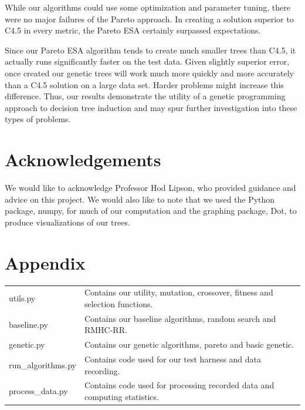 \documentclass{acm_proc_article-sp}
\begin{document}
While our algorithms could use some optimization and parameter tuning, there were no major failures of the Pareto approach. In creating a solution superior to C4.5 in every metric, the Pareto ESA certainly surpassed expectations.

Since our Pareto ESA algorithm tends to create much smaller trees than C4.5, it actually runs significantly faster on the test data. Given slightly superior error, once created our genetic trees will work much more quickly and more accurately than a C4.5 solution on a large data set. Harder problems might increase this difference. Thus, our results demonstrate the utility of a genetic programming approach to decision tree induction and may spur further investigation into these types of problems.

\section{Acknowledgements}

We would like to acknowledge Professor Hod Lipson, who provided guidance and advice on this project. We would also like to note that we used the Python package, numpy, for much of our computation and the graphing package, Dot, to produce visualizations of our trees.

\section{Appendix}

\begin{tabular}{|l|l|}
\hline
utils.py & Contains our utility, mutation, crossover, fitness and selection functions. \\
baseline.py & Contains our baseline algorithms, random search and RMHC-RR. \\
genetic.py & Contains our genetic algorithms, pareto and basic genetic. \\
run\_algorithms.py & Contains code used for our test harness and data recording. \\
process\_data.py & Contains code used for processing recorded data and computing statistics. \\ \hline
\end{tabular}

%

%
%
\balancecolumns
\end{document}
